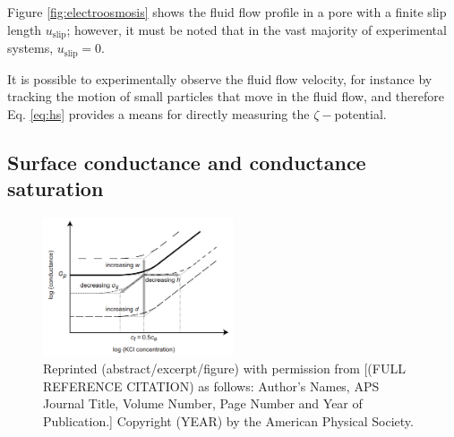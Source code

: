 			Figure \ref{fig:electroosmosis} shows the fluid flow profile in a pore with a finite slip length $u_{\mathrm{slip}}$; however, it must be noted that in the vast majority of experimental systems, $u_{\mathrm{slip}}=0$.
			
			It is possible to experimentally observe the fluid flow velocity, for instance by tracking the motion of small particles that move in the fluid flow, and therefore Eq. \ref{eq:hs} provides a means for directly measuring the $\zeta-$potential.
			
		\subsection{Surface conductance and conductance saturation}
		
			\begin{figure} 
				\includegraphics[width=0.5\textwidth]{Schoch2008_conductance}
				\caption{Reprinted (abstract/excerpt/figure) with permission from [(FULL REFERENCE CITATION) as follows: Author's Names, APS Journal Title, Volume Number, Page Number and Year of Publication.] Copyright (YEAR) by the American Physical Society.}
				\label{fig:Schoch2008conductance}
			\end{figure}
		
